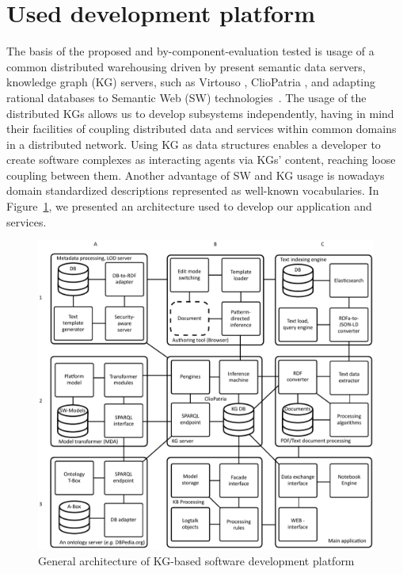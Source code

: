 \documentclass[
]{ceurart}
\begin{document}
\section{Used development platform}

The basis of the proposed and by-component-evaluation tested is usage of a common distributed warehousing driven by present semantic data servers, knowledge graph (KG) \cite{kg} servers, such as Virtouso \cite{virtuoso}, ClioPatria \cite{b8}, and adapting rational databases to Semantic Web (SW) technologies~\cite{tbl}.  The usage of the distributed KGs allows us to develop subsystems independently, having in mind their facilities of coupling distributed data and services within common domains in a distributed network.  Using KG as data structures enables a developer to create software complexes as interacting agents via KGs' content, reaching loose coupling between them.  Another advantage of SW and KG usage is nowadays domain standardized descriptions represented as well-known vocabularies.  In Figure~\ref{fig:arch}, we presented an architecture used to develop our application and services.

\begin{figure}
\centering
\includegraphics[width=1\linewidth]{architecture-mda-lod-ext-general.pdf}
\caption{General architecture of KG-based software development platform}
\label{fig:arch}
\end{figure}
\end{document}
